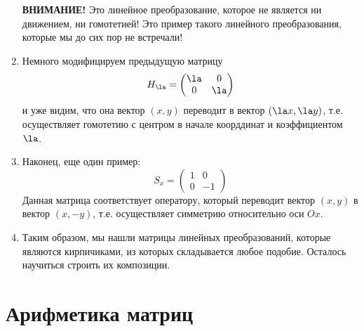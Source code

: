 \begin{enumerate}
\textbf{ВНИМАНИЕ!} Это линейное преобразование, которое не является ни движением, ни гомотетией! Это пример такого линейного преобразования, которые мы до сих пор не встречали!


\item Немного модифицируем предыдущую матрицу
$$
H_\la = \begin{pmatrix}
\la & 0 \\ 0 & \la
\end{pmatrix}
$$
и уже видим, что она вектор $(x,y)$ переводит в вектор $(\la x,\la y)$, т.е. осуществляет гомотетию с центром в начале коорддинат и коэффициентом $\la$.

\item Наконец, еще один пример:
$$
S_x = \begin{pmatrix}
1 & 0 \\ 0 & -1
\end{pmatrix}
$$
Данная матрица соответствует оператору, который переводит вектор $(x,y)$ в вектор $(x,-y)$, т.е. осуществляет симметрию относительно оси $Ox$.

\item Таким образом, мы нашли матрицы линейных преобразований, которые являются кирпичиками, из которых складывается любое подобие. Осталось научиться строить их композиции.

\end{enumerate}


\section{Арифметика матриц}


